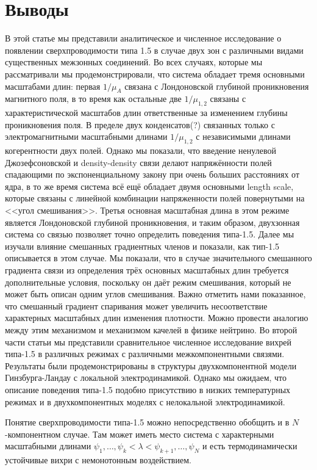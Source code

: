 \chapter{Выводы}

В этой статье мы представили аналитическое и численное исследование о 
появлении сверхпроводимости типа 1.5 в случае двух зон с различными видами 
существенных межзонных соединений. Во всех случаях, которые мы рассматривали 
мы продемонстрировали, что система обладает тремя основными масштабами длин: 
первая \( 1/\mu_A \) связана с Лондоновской глубиной 
проникновения магнитного поля, в то время как остальные две \( 1/\mu_{1,2} \) 
связаны с характеристической масштабов длин ответственные за изменением 
глубины проникновения поля. В пределе двух конденсатов(?) связанных только с 
электромагнитными масштабными длинами \( 1/\mu_{1,2} \) с независимыми  
длинами когерентности двух полей. Однако мы показали, что введение ненулевой 
Джозефсоновской и density-density связи делают напряжённости полей спадающими 
по экспоненциальному закону при очень больших расстояниях от ядра, в то же 
время система всё ещё обладает двумя основными length scale, которые связаны 
с линейной комбинации напряженности полей повернутыми на <<угол смешивания>>. 
Третья основная масштабная длина в этом режиме является Лондоновской глубиной 
проникновения, и таким образом, двухзонная система со связью позволяет точно 
определить поведения типа-1.5. Далее мы изучали влияние смешанных градиентных 
членов и показали, как тип-1.5 описывается в этом случае. Мы показали, что в 
случае значительного смешанного градиента связи из определения трёх основных 
масштабных длин требуется дополнительные условия, поскольку он даёт режим 
смешивания, который не может быть описан одним углов смешивания. Важно 
отметить нами показанное, что смешанный градиент спаривания может увеличить 
несоответствие характерных масштабных длин изменения плотности. Можно провести 
аналогию между этим механизмом и механизмом качелей в физике нейтрино. Во 
второй части статьи мы представили сравнительное численное исследование 
вихрей типа-1.5 в различных режимах с различными межкомпонентными связями. 
Результаты были продемонстрированы в структуры двухкомпонентной модели 
Гинзбурга-Ландау с локальной электродинамикой. Однако мы ожидаем, что 
описание поведения типа-1.5 подобно присутствию в низких температурных 
режимах и в двухкомпонентных моделях с нелокальной электродинамикой.   

Понятие сверхпроводимости типа-1.5 можно непосредственно обобщить и в 
\( N \)-компонентном случае. Там может иметь место система с  
характерными масштабными длинами 
\( 
	\psi_1, \ldots, \psi_k < \lambda < \psi_{k+1}, \ldots, \psi_N
\) 
и есть термодинамически устойчивые вихри с немонотонным воздействием. 

